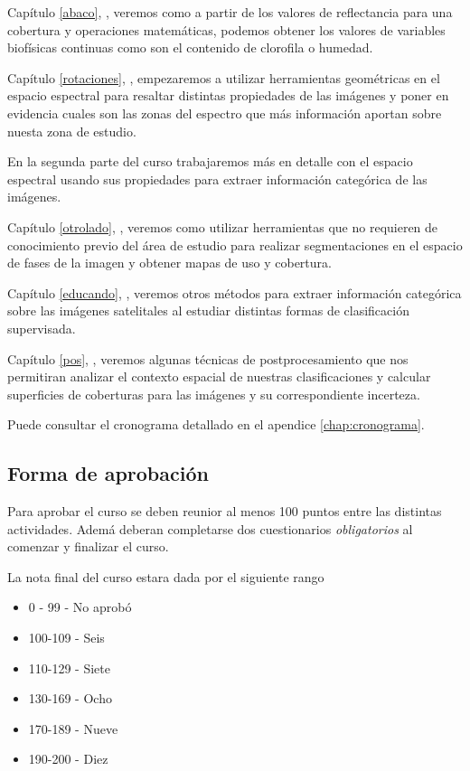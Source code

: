 Cap\'itulo  \ref{abaco}, , veremos como a partir de los valores de reflectancia para una cobertura y operaciones matem\'aticas, podemos obtener los valores de variables biof\'isicas continuas como son el contenido de clorofila o humedad.

Cap\'itulo  \ref{rotaciones}, , empezaremos a utilizar herramientas geom\'etricas en el espacio espectral para resaltar distintas propiedades de las im\'agenes y poner en evidencia cuales son las zonas del espectro que m\'as informaci\'on aportan sobre nuesta zona de estudio.

En la segunda parte del curso trabajaremos m\'as en detalle con el espacio
espectral usando sus propiedades para extraer informaci\'on categ\'orica de
las im\'agenes.

Cap\'itulo  \ref{otrolado}, , veremos como utilizar herramientas que no requieren de conocimiento previo del \'area de estudio para realizar segmentaciones en el espacio de fases de la imagen y obtener mapas de uso y cobertura.

Cap\'itulo  \ref{educando}, , veremos otros m\'etodos para extraer informaci\'on categ\'orica sobre las im\'agenes satelitales al estudiar distintas formas de clasificaci\'on supervisada.

Cap\'itulo  \ref{pos}, , veremos algunas t\'ecnicas de postprocesamiento que nos permitiran analizar el contexto espacial de nuestras clasificaciones y calcular superficies de coberturas para las im\'agenes y su correspondiente incerteza.

Puede consultar el cronograma detallado en el apendice \ref{chap:cronograma}.

\subsection{Forma de aprobaci\'on}
Para aprobar el curso se deben reunior al menos 100 puntos entre las distintas actividades. Adem\'a deberan completarse dos cuestionarios \emph{obligatorios} al comenzar y finalizar el curso.

La nota final del curso estara dada por el siguiente rango

\begin{itemize}
\item 0 - 99 - No aprobó
\item 100-109 - Seis
\item 110-129 - Siete
\item 130-169 - Ocho
\item 170-189 - Nueve
\item 190-200 - Diez
\end{itemize}

